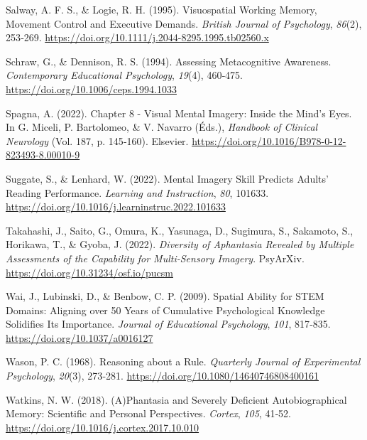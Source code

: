 \documentclass[
  12pt,
]{article}
\newlength{\cslhangindent}
\newlength{\cslentryspacingunit} %
\newenvironment{CSLReferences}[2] %
 {%
  \setlength{\parindent}{0pt}
  \ifodd #1
  \let\oldpar\par
  \def\par{\hangindent=\cslhangindent\oldpar}
  \fi
  \setlength{\parskip}{#2\cslentryspacingunit}
 }%
 {}
\begin{document}
\begin{CSLReferences}{1}{0}
\leavevmode{}%
Salway, A. F. S., \& Logie, R. H. (1995). Visuospatial Working Memory,
Movement Control and Executive Demands. \emph{British Journal of
Psychology}, \emph{86}(2), 253‑269.
\url{https://doi.org/10.1111/j.2044-8295.1995.tb02560.x}

\leavevmode{}%
Schraw, G., \& Dennison, R. S. (1994). Assessing {Metacognitive
Awareness}. \emph{Contemporary Educational Psychology}, \emph{19}(4),
460‑475. \url{https://doi.org/10.1006/ceps.1994.1033}

\leavevmode{}%
Spagna, A. (2022). Chapter 8 - {Visual} Mental Imagery: {Inside} the
Mind's Eyes. In G. Miceli, P. Bartolomeo, \& V. Navarro (Éds.),
\emph{Handbook of {Clinical Neurology}} (Vol. 187, p. 145‑160).
{Elsevier}. \url{https://doi.org/10.1016/B978-0-12-823493-8.00010-9}

\leavevmode{}%
Suggate, S., \& Lenhard, W. (2022). Mental Imagery Skill Predicts
Adults' Reading Performance. \emph{Learning and Instruction}, \emph{80},
101633. \url{https://doi.org/10.1016/j.learninstruc.2022.101633}

\leavevmode{}%
Takahashi, J., Saito, G., Omura, K., Yasunaga, D., Sugimura, S.,
Sakamoto, S., Horikawa, T., \& Gyoba, J. (2022). \emph{Diversity of
Aphantasia Revealed by Multiple Assessments of the Capability for
Multi-Sensory Imagery}. {PsyArXiv}.
\url{https://doi.org/10.31234/osf.io/pucsm}

\leavevmode{}%
Wai, J., Lubinski, D., \& Benbow, C. P. (2009). Spatial Ability for
{STEM} Domains: {Aligning} over 50 Years of Cumulative Psychological
Knowledge Solidifies Its Importance. \emph{Journal of Educational
Psychology}, \emph{101}, 817‑835. \url{https://doi.org/10.1037/a0016127}

\leavevmode{}%
Wason, P. C. (1968). Reasoning about a {Rule}. \emph{Quarterly Journal
of Experimental Psychology}, \emph{20}(3), 273‑281.
\url{https://doi.org/10.1080/14640746808400161}

\leavevmode{}%
Watkins, N. W. (2018). ({A})Phantasia and Severely Deficient
Autobiographical Memory: {Scientific} and Personal Perspectives.
\emph{Cortex}, \emph{105}, 41‑52.
\url{https://doi.org/10.1016/j.cortex.2017.10.010}


\end{CSLReferences}
\end{document}
